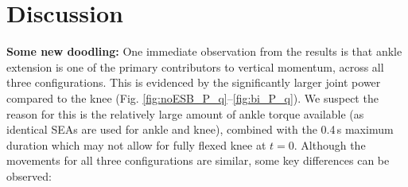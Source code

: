 \documentclass[letterpaper, 10 pt, conference]{ieeeconf}  %
\begin{document}
\section{Discussion} \label{sec:discussion}


\textbf{Some new doodling:}
One immediate observation from the results is that ankle extension is one of the primary contributors to vertical momentum, across all three configurations. This is evidenced by the significantly larger joint power compared to the knee (Fig. \ref{fig:noESB_P_q}--\ref{fig:bi_P_q}). We suspect the reason for this is the relatively large amount of ankle torque available (as identical SEAs are used for ankle and knee), combined with the 0.4\,s maximum duration which may not allow for fully flexed knee at $t=0$. Although the movements for all three configurations are similar, some key differences can be observed:
\end{document}
